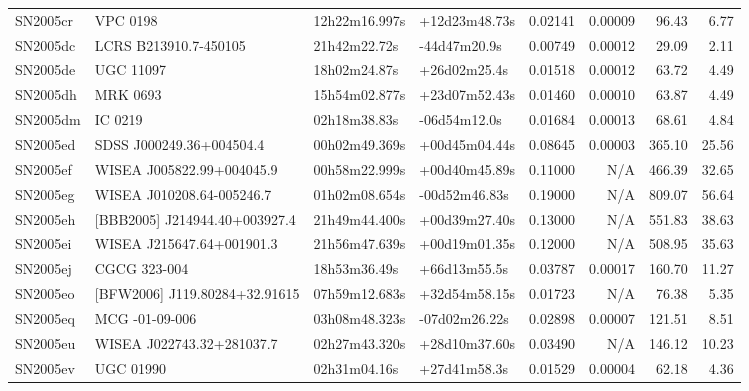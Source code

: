 \begin{longtable}{llllrrrr}
SN2005cr         &                        VPC 0198 &   12h22m16.997s &   +12d23m48.73s &  0.02141 &  0.00009 &    96.43 &        6.77 \\
SN2005dc         &           LCRS B213910.7-450105 &    21h42m22.72s &    -44d47m20.9s &  0.00749 &  0.00012 &    29.09 &        2.11 \\
SN2005de         &                       UGC 11097 &    18h02m24.87s &    +26d02m25.4s &  0.01518 &  0.00012 &    63.72 &        4.49 \\
SN2005dh         &                        MRK 0693 &   15h54m02.877s &   +23d07m52.43s &  0.01460 &  0.00010 &    63.87 &        4.49 \\
SN2005dm         &                         IC 0219 &    02h18m38.83s &    -06d54m12.0s &  0.01684 &  0.00013 &    68.61 &        4.84 \\
SN2005ed         &        SDSS J000249.36+004504.4 &   00h02m49.369s &   +00d45m04.44s &  0.08645 &  0.00003 &   365.10 &       25.56 \\
SN2005ef         &       WISEA J005822.99+004045.9 &   00h58m22.999s &   +00d40m45.89s &  0.11000 &      N/A &   466.39 &       32.65 \\
SN2005eg         &       WISEA J010208.64-005246.7 &   01h02m08.654s &   -00d52m46.83s &  0.19000 &      N/A &   809.07 &       56.64 \\
SN2005eh         &  [BBB2005] J214944.40+003927.4  &   21h49m44.400s &   +00d39m27.40s &  0.13000 &      N/A &   551.83 &       38.63 \\
SN2005ei         &       WISEA J215647.64+001901.3 &   21h56m47.639s &   +00d19m01.35s &  0.12000 &      N/A &   508.95 &       35.63 \\
SN2005ej         &                    CGCG 323-004 &    18h53m36.49s &    +66d13m55.5s &  0.03787 &  0.00017 &   160.70 &       11.27 \\
SN2005eo         &  [BFW2006] J119.80284+32.91615  &   07h59m12.683s &   +32d54m58.15s &  0.01723 &      N/A &    76.38 &        5.35 \\
SN2005eq         &                  MCG -01-09-006 &   03h08m48.323s &   -07d02m26.22s &  0.02898 &  0.00007 &   121.51 &        8.51 \\
SN2005eu         &       WISEA J022743.32+281037.7 &   02h27m43.320s &   +28d10m37.60s &  0.03490 &      N/A &   146.12 &       10.23 \\
SN2005ev         &                       UGC 01990 &    02h31m04.16s &    +27d41m58.3s &  0.01529 &  0.00004 &    62.18 &        4.36 \\

\end{longtable}
